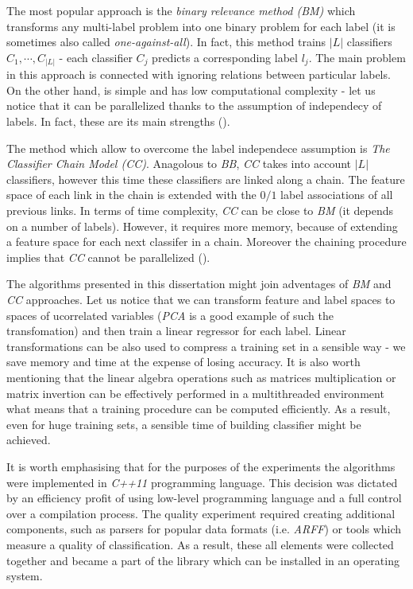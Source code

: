 The most popular approach is the \textit{binary relevance method (BM)} which transforms any multi-label problem into one binary problem for each label (it is sometimes also called \textit{one-against-all}). In fact, this method trains $|L|$ classifiers $C_1, \cdots, C_{|L|}$ - each classifier $C_j$ predicts a corresponding label $l_j$. The main problem in this approach is connected with ignoring relations between particular labels. On the other hand,  is simple and has low computational complexity - let us notice that it can be parallelized thanks to the assumption of independecy of labels. In fact, these are its main strengths (\cite{Chain}).

The method which allow to overcome the label independece assumption is \textit{The Classifier Chain Model (CC)}. Anagolous to \textit{BB}, \textit{CC} takes into account $|L|$ classifiers, however this time these classifiers are linked along a chain. The feature space of each link in the chain is extended with the $0/1$ label associations of all previous links. In terms of time complexity, \textit{CC} can be close to \textit{BM} (it depends on a number of labels). However, it requires more memory, because of extending a feature space for each next classifer in a chain. Moreover the chaining procedure implies that \textit{CC} cannot be parallelized (\cite{Chain}).

The algorithms presented in this dissertation might join adventages of \textit{BM} and \textit{CC} approaches. Let us notice that we can transform feature and label spaces to spaces of ucorrelated variables (\textit{PCA} is a good example of such the transfomation) and then train a linear regressor for each label. Linear transformations can be also used to compress a training set in a sensible way - we save memory and time at the expense of losing accuracy. It is also worth mentioning that the linear algebra operations such as matrices multiplication or matrix invertion can be effectively performed in a multithreaded environment what means that a training procedure can be computed efficiently. As a result, even for huge training sets, a sensible time of building classifier might be achieved. 

It is worth emphasising that for the purposes of the experiments the algorithms were implemented in \textit{C++11} programming language. This decision was dictated by an efficiency profit of using low-level programming language and a full control over a compilation process. The quality experiment required creating additional components, such as parsers for popular data formats (i.e. \textit{ARFF}) or tools which measure a quality of classification. As a result, these all elements were collected together and became a part of the library which can be installed in an operating system.
